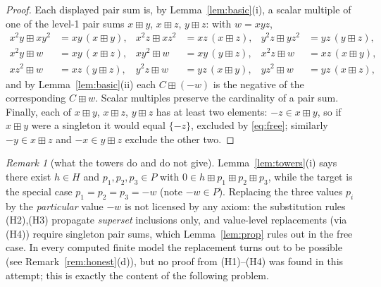 \documentclass[11pt]{article}
\theoremstyle{definition}
\theoremstyle{remark}
\newtheorem{remark}[theorem]{Remark}
\newcommand{\bp}{\boxplus}
\begin{document}
\begin{proof}
Each displayed pair sum is, by Lemma~\ref{lem:basic}(i), a scalar multiple
of one of the level-1 pair sums $x\bp y$, $x\bp z$, $y\bp z$: with
$w=xyz$,
\begin{align*}
  x^2y\bp xy^2&=xy\,(x\bp y), &
  x^2z\bp xz^2&=xz\,(x\bp z), &
  y^2z\bp yz^2&=yz\,(y\bp z),\\
  x^2y\bp w&=xy\,(x\bp z), &
  xy^2\bp w&=xy\,(y\bp z), &
  x^2z\bp w&=xz\,(x\bp y),\\
  xz^2\bp w&=xz\,(y\bp z), &
  y^2z\bp w&=yz\,(x\bp y), &
  yz^2\bp w&=yz\,(x\bp z),
\end{align*}
and by Lemma~\ref{lem:basic}(ii) each $C\bp(-w)$ is the negative of the
corresponding $C\bp w$. Scalar multiples preserve the cardinality of a
pair sum. Finally, each of $x\bp y$, $x\bp z$, $y\bp z$ has at least two
elements: $-z\in x\bp y$, so if $x\bp y$ were a singleton it would equal
$\{-z\}$, excluded by \eqref{eq:free}; similarly
$-y\in x\bp z$ and $-x\in y\bp z$ exclude the other two.
\end{proof}

\begin{remark}[what the towers do and do not give]\label{rem:gap}
Lemma~\ref{lem:towers}(i) says there exist $h\in H$ and
$p_1,p_2,p_3\in P$ with $0\in h\bp p_1\bp p_2\bp p_3$, while the target
is the special case $p_1=p_2=p_3=-w$ (note $-w\in P$). Replacing the
three values $p_i$ by the \emph{particular} value $-w$ is not licensed by
any axiom: the substitution rules (H2),(H3) propagate \emph{superset}
inclusions only, and value-level replacements (via (H4)) require
singleton pair sums, which Lemma~\ref{lem:prop} rules out in the free
case. In every computed finite model the replacement turns out to be
possible (see Remark~\ref{rem:honest}(d)), but no proof from (H1)--(H4)
was found in this attempt; this is exactly the content of the following
problem.
\end{remark}
\end{document}
